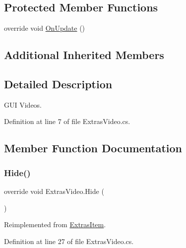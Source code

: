 \subsection*{Protected Member Functions}
\begin{DoxyCompactItemize}
\item 
override void \mbox{\hyperlink{class_extras_video_a95bb26f30ade2007459db62a88285e97}{On\+Update}} ()
\end{DoxyCompactItemize}
\subsection*{Additional Inherited Members}


\subsection{Detailed Description}
G\+UI Videos. 



Definition at line 7 of file Extras\+Video.\+cs.



\subsection{Member Function Documentation}
\mbox{\label{class_extras_video_a546c420f0653ab38b223e6bb11e805ee}} 
\subsubsection{\texorpdfstring{Hide()}{Hide()}}
{\footnotesize\ttfamily override void Extras\+Video.\+Hide (\begin{DoxyParamCaption}{ }\end{DoxyParamCaption})\hspace{0.3cm}{\ttfamily [virtual]}}



Reimplemented from \mbox{\hyperlink{class_extras_item_ac209e4ed8ec16d9ad9f24eba19057fe2}{Extras\+Item}}.



Definition at line 27 of file Extras\+Video.\+cs.

\mbox{\label{class_extras_video_a95bb26f30ade2007459db62a88285e97}} 
